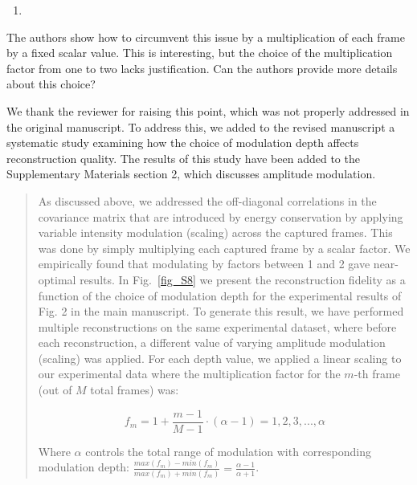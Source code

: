 \documentclass[12pt]{article}
\newenvironment{solved_reviewercomment}
    {\begin{tcolorbox}[width=\linewidth,colback=gray!5,colframe=solved_commentcolor!50,title=Reviewer Comment,left=5pt,right=5pt]}
    {\end{tcolorbox}}
\newenvironment{finished_ourresponse}
    {\begin{tcolorbox}[width=\linewidth,breakable,enhanced,colback=gray!5,colframe=finished_responsecolor!50,title=Response,left=5pt,right=5pt]}
    {\end{tcolorbox}}
\begin{document}
    
\begin{enumerate}[label=\arabic*., resume]
\item \leavevmode
\end{enumerate}
\vspace{-1em}
\begin{solved_reviewercomment}
    The authors show how to circumvent this issue by a multiplication of each frame by a fixed scalar value. This is interesting, but the choice of the multiplication factor from one to two lacks justification. Can the authors provide more details about this choice? 
\end{solved_reviewercomment}

\begin{finished_ourresponse}
We thank the reviewer for raising this point, which was not properly addressed in the original manuscript. To address this, we added to the revised manuscript a systematic study examining how the choice of modulation depth affects reconstruction quality. The results of this study have been added to the Supplementary Materials section 2, which discusses amplitude modulation.



\begin{quote}

As discussed above, we addressed the off-diagonal correlations in the covariance matrix that are introduced by energy conservation by applying variable intensity modulation (scaling) across the captured frames. This was done by simply multiplying each captured frame by a scalar factor. We empirically found that modulating by factors between 1 and 2 gave near-optimal results. In Fig.~\ref{fig_S8} we present the reconstruction fidelity as a function of the choice of modulation depth for the experimental results of Fig. 2 in the main manuscript. To generate this result, we have performed multiple reconstructions on the same experimental dataset, where before each reconstruction, a different value of varying amplitude modulation (scaling) was applied. For each depth value, we applied a linear scaling to our experimental data where the multiplication factor for the $m$-th frame (out of $M$ total frames) was:


\begin{equation}
    f_m = 1 + \frac{m-1}{M-1} \cdot (\alpha -1) = 1, 2, 3, ..., \alpha
\end{equation}

Where $\alpha$ controls the total range of modulation with corresponding modulation depth: $\frac{max(f_m)-min(f_m)}{max(f_m)+min(f_m)}=\frac{\alpha-1}{\alpha+1}$.


\end{quote}
\end{finished_ourresponse}
\end{document}
